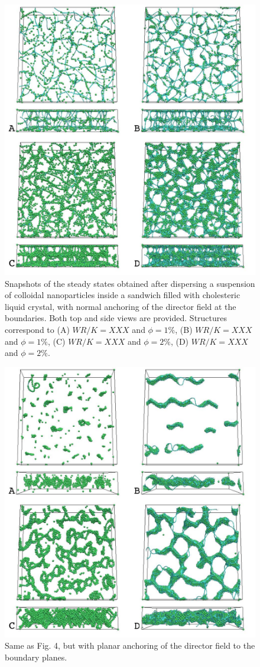 \documentclass[12pt]{article}
\begin{document}
\begin{figure}
\includegraphics[width=\textwidth]{s3.jpg}
\caption{Snapshots of the steady states obtained after dispersing
a suspension of colloidal nanoparticles inside a sandwich filled with
cholesteric liquid crystal, with normal anchoring of the director field
at the boundaries. Both top and side views are provided. 
Structures correspond
to (A) $WR/K=XXX$ and $\phi=1\%$, (B) $WR/K=XXX$ and $\phi=1\%$,
(C) $WR/K=XXX$ and $\phi=2\%$, (D) $WR/K=XXX$ and $\phi=2\%$.
}
\end{figure}

\begin{figure}
\includegraphics[width=\textwidth]{s4.jpg}
\caption{Same as Fig. 4, but with planar anchoring of the director 
field to the boundary planes.}
\end{figure}
\end{document}
